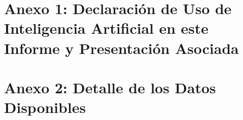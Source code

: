 \documentclass[pdftex,spanish]{pucthesis}	%
\begin{document}

\setlength{\bibitemsep}{0.3em}
{\small\singlespacing}


\appendix %

\newpage
\section[Anexo 1: Declaraci\'on de Uso de IA]{Anexo 1: Declaraci\'on de Uso de Inteligencia Artificial en este Informe y Presentaci\'on Asociada}


\newpage
\section[Anexo 2: Datos Disponibles]{Anexo 2: Detalle de los Datos Disponibles}

\end{document}
